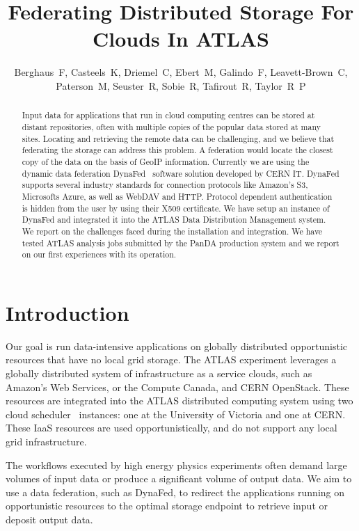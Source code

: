 \documentclass[a4paper]{jpconf}
\begin{document}
\title{Federating Distributed Storage For Clouds In ATLAS}

\author{Berghaus~F, Casteels~K, Driemel~C, Ebert~M, Galindo~F, Leavett-Brown~C, Paterson~M, Seuster~R, Sobie~R, Tafirout~R, Taylor~R~P}

\address{Frank~Berghaus, G07810, CERN, CH-1211 Geneva 23,  Switzerland}


\begin{abstract}
Input data for applications that run in cloud computing centres can be stored at distant repositories, often with multiple copies of the popular data stored at many sites. Locating and retrieving the remote data can be challenging, and we believe that federating the storage can address this problem. A federation would locate the closest copy of the data on the basis of GeoIP information. Currently we are using the dynamic data federation DynaFed~\cite{dynafed} software solution developed by CERN IT. DynaFed supports several industry standards for connection protocols like Amazon's S3, Microsofts Azure, as well as WebDAV and HTTP. Protocol dependent authentication is hidden from the user by using their X509 certificate. We have setup an instance of DynaFed and integrated it into the ATLAS Data Distribution Management system. We report on the challenges faced during the installation and integration. We have tested ATLAS analysis jobs submitted by the PanDA production system and we report on our first experiences with its operation.
\end{abstract}

\section{Introduction}
Our goal is run data-intensive applications on globally distributed opportunistic resources that have no local grid storage. The ATLAS experiment leverages a globally distributed system of infrastructure as a service clouds, such as Amazon's Web Services, or the Compute Canada, and CERN OpenStack. These resources are integrated into the ATLAS distributed computing system using two cloud scheduler~\cite{cloud-scheduler} instances: one at the University of Victoria and one at CERN. These IaaS resources are used opportunistically, and do not support any local grid infrastructure.

The workflows executed by high energy physics experiments often demand large volumes of input data or produce a significant volume of output data. We aim to use a data federation, such as DynaFed, to redirect the applications running on opportunistic resources to the optimal storage endpoint to retrieve input or deposit output data.
\end{document}
